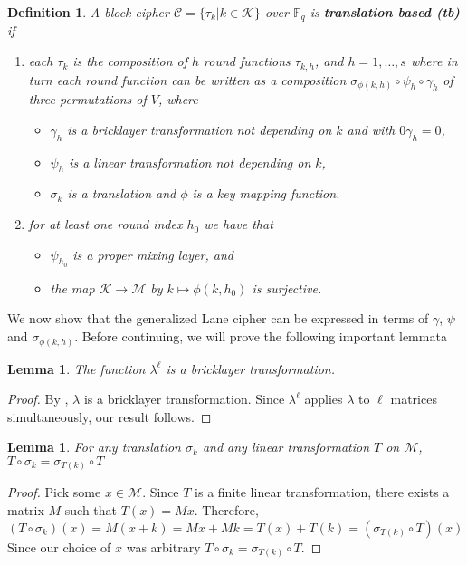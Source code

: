 \documentclass[11pt]{amsart}
\newcommand{\KK}{\mathcal{K}}
\newcommand{\MM}{\mathcal{M}}
\newtheorem{definition}{{\bf Definition}}
\newtheorem{lemma}[theorem]{{\bf Lemma }}
\begin{document}
\begin{definition}
A block cipher $\mathcal{C} = \{\tau_k | k \in \KK\}$ over $\mathbb{F}_q$ is \textbf{translation based (tb)} if
\begin{enumerate}
\item each $\tau_k$ is the composition of $h$ round functions $\tau_{k,h}$, and $h = 1,\dots,s$ where in turn each round function can be written as a composition $\sigma_{\phi(k,h)} \circ \psi_h \circ \gamma_h$ of three permutations of $V$, where
\begin{itemize}
\item $\gamma_h$ is a bricklayer transformation not depending on $k$ and with $0 \gamma_h = 0$,
\item $\psi_h$ is a linear transformation not depending on $k$,
\item $\sigma_k$ is a translation and $\phi$ is a key mapping function.
\end{itemize}
\item for at least one round index $h_0$ we have that
\begin{itemize}
\item $\psi_{h_0}$ is a proper mixing layer, and
\item the map $\KK \to \MM$ by $k \mapsto \phi(k,h_0)$ is surjective.
\end{itemize}
\end{enumerate}
\end{definition}

We now show that the generalized Lane cipher can be expressed in terms of $\gamma$, $\psi$ and $\sigma_{\phi(k,h)}$. Before continuing, we will prove the following important lemmata

\begin{lemma} \label{SBBricklayer}
The function $\lambda^\ell$ is a bricklayer transformation.
\end{lemma}

\begin{proof} By \cite{REU}, $\lambda$ is a bricklayer transformation. Since $\lambda^\ell$ applies $\lambda$ to $\ell$ matrices simultaneously, our result follows.
\end{proof}

\begin{lemma} \label{CommuteLinear}
For any translation $\sigma_k$ and any linear transformation $T$ on $\MM$, $T \circ \sigma_k = \sigma_{T(k)} \circ T$
\end{lemma}
\begin{proof}
Pick some $x \in \MM$. Since $T$ is a finite linear transformation, there exists a matrix $M$ such that $T(x) = Mx$. Therefore,
\[
(T \circ \sigma_k)(x) = M(x + k) = Mx + Mk = T(x) + T(k) = (\sigma_{T(k)} \circ T)(x)
\]
Since our choice of $x$ was arbitrary $T \circ \sigma_k = \sigma_{T(k)} \circ T$.
\end{proof}
\end{document}
